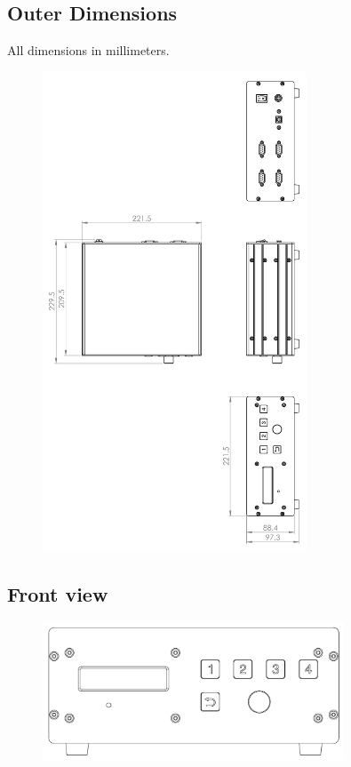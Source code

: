 \documentclass[a4paper, final, 12pt, oneside]{scrartcl}
\numberwithin{equation}{section}
\numberwithin{table}{section}
\numberwithin{figure}{section}
\begin{document}
\FloatBarrier
\newpage

\subsection*{Outer Dimensions}
All dimensions in millimeters.
\begin{figure}[!htp]
  \centering
  \includegraphics[angle=0,origin=c,width=0.7\textwidth]{./drawings/MG22131_outline2.pdf}
\end{figure}
\FloatBarrier

\subsection*{Front view}
\begin{figure}[!htp]
  \centering
  \includegraphics[angle=0,origin=c,width=0.8\textwidth]{./drawings/MG22131_front.pdf}
\end{figure}
\end{document}
